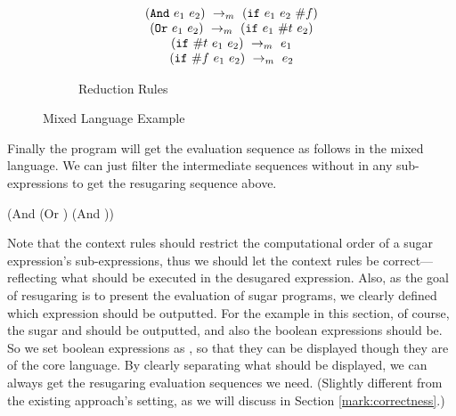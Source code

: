 \begin{figure}[thb]
\begin{subfigure}{\linewidth}{\footnotesize
    \begin{flushleft}
        \[
        \begin{array}{c}
        (\mbox{\tt And}~e_1~e_2) ~\rightarrow_m~(\mbox{\tt if}~e_1~e_2~\#f)\\
        (\mbox{\tt Or}~e_1~e_2) ~\rightarrow_m~(\mbox{\tt if}~e_1~\#t~e_2)\\
        (\mbox{\tt if}~\#t~e_1~e_2) ~\rightarrow_m~e_1\\
        (\mbox{\tt if}~\#f~e_1~e_2) ~\rightarrow_m~e_2 
        \end{array}
        \]
    \end{flushleft}
    \caption{Reduction Rules}
    \label{fig:mixreduction}
}
\end{subfigure}

\caption{Mixed Language Example}
\label{fig:mixexample}
\end{figure}

Finally the program  will get the evaluation sequence as follows in the mixed language. We can just filter the intermediate sequences without  in any sub-expressions to get the resugaring sequence above.

{\scriptsize
\begin{Codes}
    (And (Or \true \false) (And \false \true))
\OneStep{ \false}
\end{Codes}
}
Note that the context rules should restrict the computational order of a sugar expression's sub-expressions, thus we should let the context rules be correct---reflecting what should be executed in the desugared expression. Also, as the goal of resugaring is to present the evaluation of sugar programs, we clearly defined which expression should be outputted. For the example in this section, of course, the sugar  and  should be outputted, and also the boolean expressions should be. So we set boolean expressions as , so that they can be displayed though they are of the core language. By clearly separating what should be displayed, we can always get the resugaring evaluation sequences we need. (Slightly different from the existing approach's setting, as we will discuss in Section \ref{mark:correctness}.)